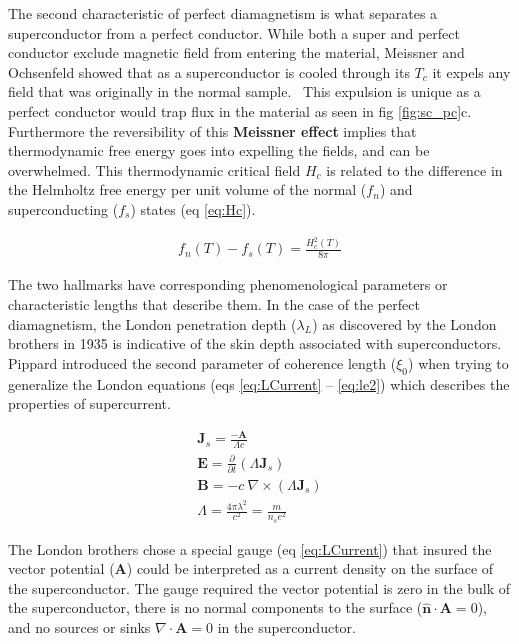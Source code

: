 \documentclass[
reprint,
amsmath,amssymb,
aps,
tikz,
border=5pt
]{revtex4-1}
\begin{document}
    The second characteristic of perfect diamagnetism is what separates a superconductor from a perfect conductor. While both a super and perfect conductor exclude magnetic field from entering the material, Meissner and Ochsenfeld showed that as a superconductor is cooled through its $T_c$ it expels any field that was originally in the normal sample.~\cite{MnO1933,tinkham} This expulsion is unique as a perfect conductor would trap flux in the material as seen in fig \ref{fig:sc_pc}c. Furthermore the reversibility of this \textbf{Meissner effect} implies that thermodynamic free energy goes into expelling the fields, and can be overwhelmed. This thermodynamic critical field  $H_c$ is related to the difference in the Helmholtz free energy per unit volume of the normal ($f_n$) and superconducting ($f_s$) states (eq \ref{eq:Hc}).
    
    \begin{gather}
      f_n(T) - f_s(T) = \frac{H_c^2(T)}{8\pi}
      \label{eq:Hc} 
    \end{gather}

    The two hallmarks have corresponding phenomenological parameters or characteristic lengths that describe them. In the case of the perfect diamagnetism, the London penetration depth ($\lambda_L$) as discovered by the London brothers in 1935 is indicative of the skin depth associated with superconductors. Pippard introduced the second parameter of coherence length ($\xi_0$) when trying to generalize the London  equations (eqs \ref{eq:LCurrent} -- \ref{eq:le2}) which describes the properties of supercurrent.~\cite{tinkham, pippard}

    \begin{gather}
      \mathbf{J}_s = \frac{-\mathbf{A}}{\Lambda c}
      \label{eq:LCurrent}\\
      \mathbf{E} = \frac{\partial}{\partial t}(\Lambda \mathbf{J}_s)  
      \label{eq:le1} \\
      \mathbf{B} = -c ~\nabla \times (\Lambda \mathbf{J}_s)  
      \label{eq:le2} \\
      \Lambda = \frac{4\pi \lambda^2}{c^2}  = \frac{m}{n_s e^2}
    \end{gather}

    The London brothers chose a special gauge (eq \ref{eq:LCurrent}) that insured the vector potential ($\mathbf{A}$) could be interpreted as a current density on the surface of the superconductor. The gauge required the vector potential is zero in the bulk of the superconductor, there is no normal components to the surface ($\hat{\mathbf{n}}\cdot \mathbf{A} = 0$), and no sources or sinks $\nabla \cdot \mathbf{A} = 0$ in the superconductor. 
    
\end{document}
